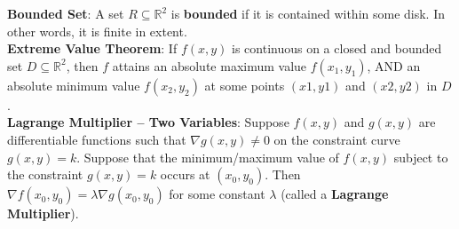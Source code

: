 \documentclass{article}
\begin{document}
\begin{multicols*}{3}
\textbf{Bounded Set}: A set $R\subseteq\mathbb{R}^2$ is \textbf{bounded} if it is contained within some disk. In other words, it is finite in extent.\\
\textbf{Extreme Value Theorem}: If $f(x,y)$ is continuous on a closed and bounded set $D\subseteq\mathbb{R}^2$, then $f$ attains an absolute maximum value $f(x_1, y_1)$, AND
an absolute minimum value $f(x_2, y_2)$ at some points $(x1, y1)$ and $(x2, y2)$ in $D$.\\
\textbf{Lagrange Multiplier – Two Variables}: Suppose $f(x,y)$ and $g(x,y)$ are differentiable functions such that $\nabla g(x, y) \not= 0$ on the constraint curve $g(x, y) = k$.
Suppose that the minimum/maximum value of $f(x,y)$ subject to the constraint $g(x, y) = k$ occurs at $(x_0, y_0)$. Then $\nabla f(x_0,y_0)=\lambda \nabla g(x_0,y_0)$ 
for some constant $\lambda$ (called a \textbf{Lagrange Multiplier}). 


\end{multicols*}
\end{document}
